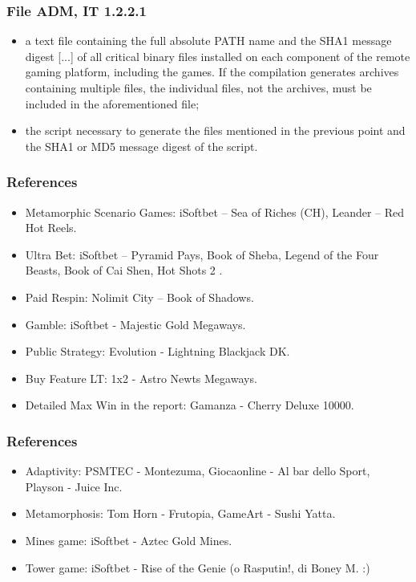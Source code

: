 \documentclass{beamer}
\begin{document}
\begin{frame}
\frametitle{File ADM, IT 1.2.2.1}
\begin{itemize}
\item<1-> a text file containing the full absolute PATH name and the SHA1 message digest [...] of all critical binary files installed on each component of the remote gaming platform, including the games. If the compilation generates archives containing multiple files, the individual files, not the archives, must be included in the aforementioned file;
\item<1-> the script necessary to generate the files mentioned in the previous point and the SHA1 or MD5 message digest of the script.
\end{itemize}
\end{frame}

\begin{frame}
\frametitle{References}
\begin{itemize}
\item<1-> Metamorphic Scenario Games: iSoftbet -- Sea of Riches (CH), Leander -- Red Hot Reels.
\item<1-> Ultra Bet: iSoftbet -- Pyramid Pays, Book of Sheba, Legend of the Four Beasts, Book of Cai Shen, Hot Shots 2 .
\item<1-> Paid Respin: Nolimit City -- Book of Shadows.
\item<1-> Gamble: iSoftbet - Majestic Gold Megaways.
\item<1-> Public Strategy: Evolution - Lightning Blackjack DK.
\item<1-> Buy Feature LT: 1x2 - Astro Newts Megaways.
\item<1-> Detailed Max Win in the report: Gamanza - Cherry Deluxe 10000.
\end{itemize}
\end{frame}

\begin{frame}
\frametitle{References}
\begin{itemize}
\item<1-> Adaptivity: PSMTEC - Montezuma, Giocaonline - Al bar dello Sport, Playson - Juice Inc.
\item<1-> Metamorphosis: Tom Horn - Frutopia, GameArt - Sushi Yatta.
\item<1-> Mines game: iSoftbet - Aztec Gold Mines.
\item<1-> Tower game: iSoftbet - Rise of the Genie (o Rasputin!, di Boney M. :)
\end{itemize}
\end{frame}
\end{document}

